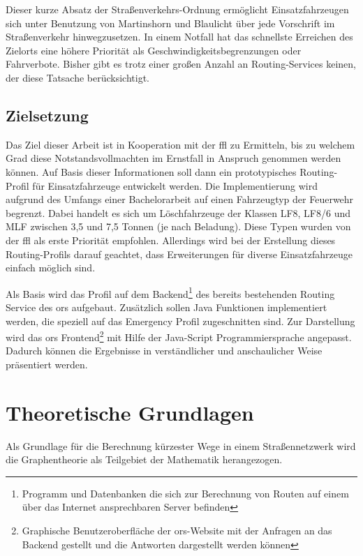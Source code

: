 \documentclass[12pt,a4paper]{article}
\begin{document}
Dieser kurze Absatz der Straßenverkehrs-Ordnung ermöglicht Einsatzfahrzeugen sich unter Benutzung von Martinshorn und Blaulicht über jede Vorschrift im Straßenverkehr hinwegzusetzen. In einem Notfall hat das schnellste Erreichen des Zielorts eine höhere Priorität als Geschwindigkeitsbegrenzungen oder Fahrverbote. Bisher gibt es trotz einer großen Anzahl an Routing-Services keinen, der diese Tatsache berücksichtigt. 


\subsection{Zielsetzung}
Das Ziel dieser Arbeit ist in Kooperation mit der \gls{ffl} zu Ermitteln, bis zu welchem Grad diese Notstandsvollmachten im Ernstfall in Anspruch genommen werden können. Auf Basis dieser Informationen soll dann ein prototypisches Routing-Profil für Einsatzfahrzeuge entwickelt werden. Die Implementierung wird aufgrund des Umfangs einer Bachelorarbeit auf einen Fahrzeugtyp der Feuerwehr begrenzt. Dabei handelt es sich um Löschfahrzeuge der Klassen LF8, LF8/6 und MLF zwischen 3,5 und 7,5 Tonnen (je nach Beladung). Diese Typen wurden von der \gls{ffl} als erste Priorität empfohlen. Allerdings wird bei der Erstellung dieses Routing-Profils darauf geachtet, dass Erweiterungen für diverse Einsatzfahrzeuge einfach möglich sind.
\vspace{0.5cm}

Als Basis wird das Profil auf dem Backend\footnote{Programm und Datenbanken die sich zur Berechnung von Routen auf einem über das Internet ansprechbaren Server befinden} des bereits bestehenden Routing Service des \gls{ors} aufgebaut. Zusätzlich sollen Java Funktionen implementiert werden, die speziell auf das Emergency Profil zugeschnitten sind. Zur Darstellung wird das \gls{ors} Frontend\footnote{Graphische Benutzeroberfläche der \gls{ors}-Website mit der Anfragen an das Backend gestellt und die Antworten dargestellt werden können} mit Hilfe der Java-Script Programmiersprache angepasst. Dadurch können die Ergebnisse in verständlicher und anschaulicher Weise präsentiert werden.

\newpage
\section{Theoretische Grundlagen}

Als Grundlage für die Berechnung kürzester Wege in einem Straßennetzwerk wird die Graphentheorie als Teilgebiet der Mathematik herangezogen. 
\end{document}
